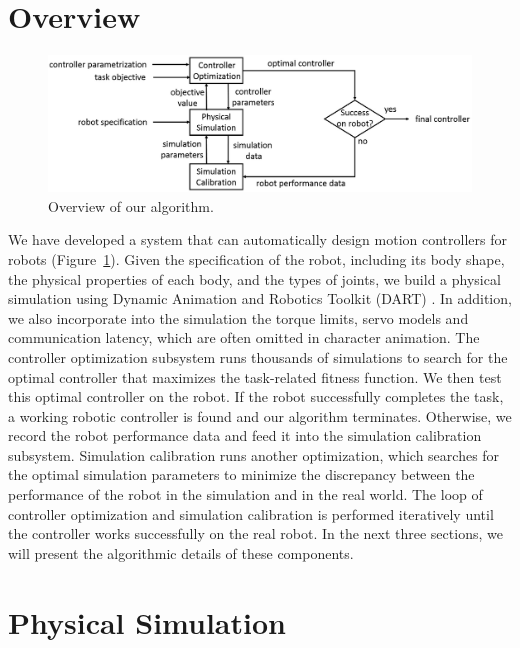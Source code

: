 \section{Overview}

\begin{figure}[!t]
  \centering
  \includegraphics[width=6in]{figures/controllerTransfer}
  \caption{Overview of our algorithm.}
  \label{fig:controllerTransferOverview}
\end{figure}

We have developed a system that can automatically design motion controllers for robots (Figure~\ref{fig:controllerTransferOverview}). Given the specification of the robot, including its body shape, the physical properties of each body, and the types of joints, we build a physical simulation using Dynamic Animation and Robotics Toolkit (DART) \cite{dart:2012}. In addition, we also incorporate into the simulation the torque limits, servo models and communication latency, which are often omitted in character animation. The controller optimization subsystem runs thousands of simulations to search for the optimal controller that maximizes the task-related fitness function. We then test this optimal controller on the robot. If the robot successfully completes the task, a working robotic controller is found and our algorithm terminates. Otherwise, we record the robot performance data and feed it into the simulation calibration subsystem. Simulation calibration runs another optimization, which searches for the optimal simulation parameters to minimize the discrepancy between the performance of the robot in the simulation and in the real world. The loop of controller optimization and simulation calibration is performed iteratively until the controller works successfully on the real robot. In the next three sections, we will present the algorithmic details of these components.

\section{Physical Simulation}

